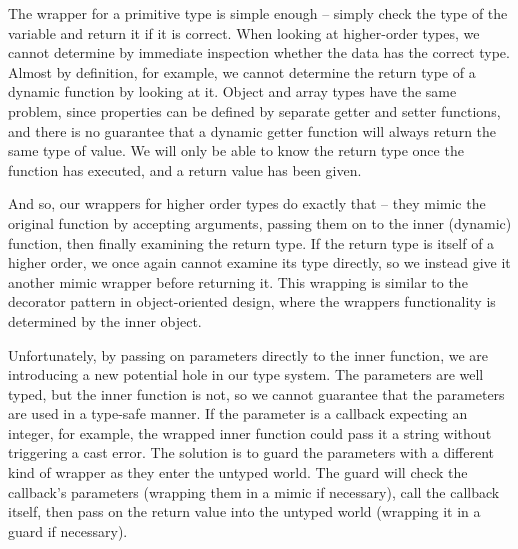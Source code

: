 \documentclass[12pt,a4paper,twoside,openright]{report}
\theoremstyle{definition}
\theoremstyle{dotless}
\begin{document}
The wrapper for a primitive type is simple enough -- simply check the type of
the variable and return it if it is correct. When looking at higher-order
types, we cannot determine by immediate inspection whether the data has the
correct type. Almost by definition, for example, we cannot determine the return
type of a dynamic function by looking at it. Object and array types have the
same problem, since properties can be defined by separate getter and setter
functions, and there is no guarantee that a dynamic getter function will always
return the same type of value. We will only be able to know the return type
once the function has executed, and a return value has been given.

And so, our wrappers for higher order types do exactly that -- they mimic the
original function by accepting arguments, passing them on to the inner
(dynamic) function, then finally examining the return type. If the return type
is itself of a higher order, we once again cannot examine its type directly, so
we instead give it another mimic wrapper before returning it. This wrapping is
similar to the decorator pattern in object-oriented design, where the wrappers
functionality is determined by the inner object. 

Unfortunately, by passing on parameters directly to the inner function, we are
introducing a new potential hole in our type system. The parameters are well
typed, but the inner function is not, so we cannot guarantee that the
parameters are used in a type-safe manner. If the parameter is a callback
expecting an integer, for example, the wrapped inner function could pass it a
string without triggering a cast error. The solution is to guard the parameters
with a different kind of wrapper as they enter the untyped world. The guard
will check the callback's parameters (wrapping them in a mimic if necessary),
call the callback itself, then pass on the return value into the untyped world
(wrapping it in a guard if necessary). 
\end{document}
